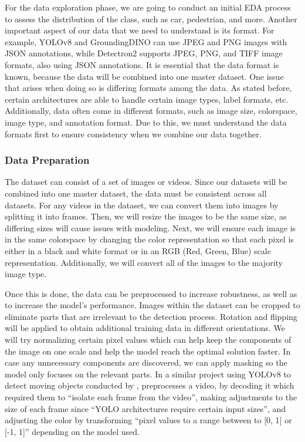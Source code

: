 \documentclass[stu,12pt,floatsintext]{apa7}
\begin{document}
For the data exploration phase, we are going to conduct an initial EDA process to assess the distribution of the class, such as car, pedestrian, and more. Another important aspect of our data that we need to understand is its format. For example, YOLOv8 and GroundingDINO can use JPEG and PNG images with JSON annotations, while Detectron2 supports JPEG, PNG, and TIFF image formats, also using JSON annotations. It is essential that the data format is known, because the data will be combined into one master dataset. One issue that arises when doing so is differing formats among the data. As stated before, certain architectures are able to handle certain image types, label formats, etc. Additionally, data often come in different formats, such as image size, colorspace, image type, and annotation format. Due to this, we must understand the data formats first to ensure consistency when we combine our data together.


\subsubsection{Data Preparation}
The dataset can consist of a set of images or videos. Since our datasets will be combined into one master dataset, the data must be consistent across all datasets. For any videos in the dataset, we can convert them into images by splitting it into frames. Then, we will resize the images to be the same size, as differing sizes will cause issues with modeling. Next, we will ensure each image is in the same colorspace by changing the color representation so that each pixel is either in a black and white format or in an RGB (Red, Green, Blue) scale representation. Additionally, we will convert all of the images to the majority image type.

Once this is done, the data can be preprocessed to increase robustness, as well as to increase the model's performance.
Images within the dataset can be cropped to eliminate parts that are irrelevant to the detection process. Rotation and flipping will be applied to obtain additional training data in different orientations. We will try normalizing certain pixel values which can help keep the components of the image on one scale and help the model reach the optimal solution faster. In case any unnecessary components are discovered, we can apply masking so the model only focuses on the relevant parts. In a similar project using YOLOv8 to detect moving objects conducted by \textcite{safaldin_improved_2024}, preprocesses a video, by decoding it which required them to ``isolate each frame from the video'', making adjustments to the size of each frame since ``YOLO architectures require certain input sizes'', and adjusting the color by transforming ``pixel values to a range between to [0, 1] or [-1, 1]'' depending on the model used.
\end{document}
